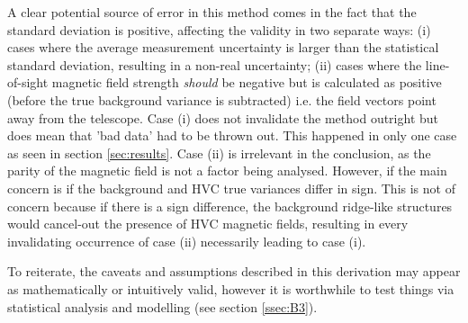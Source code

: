 A clear potential source of error in this method comes in the fact that the standard deviation is positive, affecting the validity in two separate ways: (i) cases where the average measurement uncertainty is larger than the statistical standard deviation, resulting in a non-real uncertainty; (ii) cases where the line-of-sight magnetic field strength \textit{should} be negative but is calculated as positive (before the true background variance is subtracted) i.e. the field vectors point away from the telescope. Case (i) does not invalidate the method outright but does mean that 'bad data' had to be thrown out. This happened in only one case as seen in section \ref{sec:results}. Case (ii) is irrelevant in the conclusion, as the parity of the magnetic field is not a factor being analysed. However, if the main concern is if the background and HVC true variances differ in sign. This is not of concern because if there is a sign difference, the background ridge-like structures would cancel-out the presence of HVC magnetic fields, resulting in every invalidating occurrence of case (ii) necessarily leading to case (i).


To reiterate, the caveats and assumptions described in this derivation may appear as mathematically or intuitively valid, however it is worthwhile to test things via statistical analysis and modelling (see section \ref{ssec:B3}).

%
%
%
%
%

